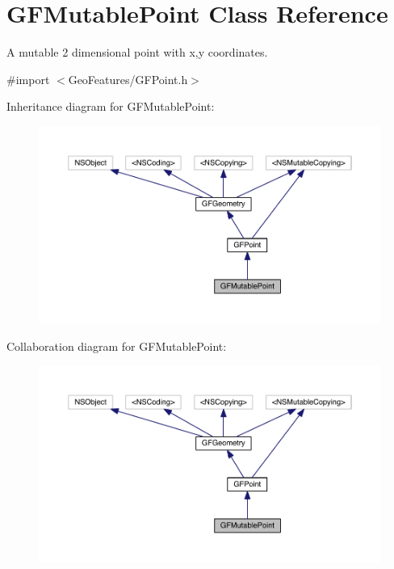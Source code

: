 \hypertarget{interface_g_f_mutable_point}{}\section{G\+F\+Mutable\+Point Class Reference}
\label{interface_g_f_mutable_point}


A mutable 2 dimensional point with x,y coordinates.  




{\ttfamily \#import $<$Geo\+Features/\+G\+F\+Point.\+h$>$}



Inheritance diagram for G\+F\+Mutable\+Point\+:\nopagebreak
\begin{figure}[H]
\begin{center}
\leavevmode
\includegraphics[width=350pt]{interface_g_f_mutable_point__inherit__graph}
\end{center}
\end{figure}


Collaboration diagram for G\+F\+Mutable\+Point\+:\nopagebreak
\begin{figure}[H]
\begin{center}
\leavevmode
\includegraphics[width=350pt]{interface_g_f_mutable_point__coll__graph}
\end{center}
\end{figure}
